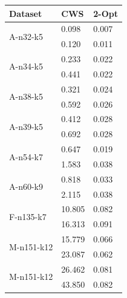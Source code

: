 \begin{table}[h!]
    \centering
    \begin{threeparttable}
    \footnotesize
        \begin{tabularx}{0.40\textwidth}{ X X X }
            \toprule
            \textbf{Dataset} & \textbf{CWS} & \textbf{2-Opt} \\ [0.5ex]
            \midrule
            \multirow{2}{*}{A-n32-k5}   & 0.098\tnote{1}   & 0.007\tnote{1} \\ [0.5ex]
                                        & 0.120\tnote{2}   & 0.011\tnote{2} \\ [0.5ex]
            \midrule
            \multirow{2}{*}{A-n34-k5}   & 0.233 & 0.022  \\ [0.5ex]
                                        & 0.441 & 0.022  \\ [0.5ex]
            \midrule
            \multirow{2}{*}{A-n38-k5}   & 0.321 & 0.024  \\ [0.5ex]
                                        & 0.592 & 0.026  \\ [0.5ex]
            \midrule
            \multirow{2}{*}{A-n39-k5}   & 0.412 & 0.028  \\ [0.5ex]
                                        & 0.692 & 0.028  \\ [0.5ex]
            \midrule
            \multirow{2}{*}{A-n54-k7}   & 0.647 & 0.019  \\ [0.5ex]
                                        & 1.583 & 0.038  \\ [0.5ex]
            \midrule
            \multirow{2}{*}{A-n60-k9}   & 0.818 & 0.033 \\ [0.5ex]
                                        & 2.115 & 0.038  \\ [0.5ex]
            \midrule
            \multirow{2}{*}{F-n135-k7}  & 10.805 & 0.082    \\ [0.5ex]
                                        & 16.313 & 0.091    \\ [0.5ex]
            \midrule
            \multirow{2}{*}{M-n151-k12} & 15.779 & 0.066    \\ [0.5ex]
                                        & 23.087 & 0.062    \\ [0.5ex]
            \midrule
            \multirow{2}{*}{M-n151-k12} & 26.462 & 0.081    \\ [0.5ex]
                                        & 43.850 & 0.082    \\ [0.5ex]
            \bottomrule

\end{tabularx}
\end{threeparttable}
\end{table}
